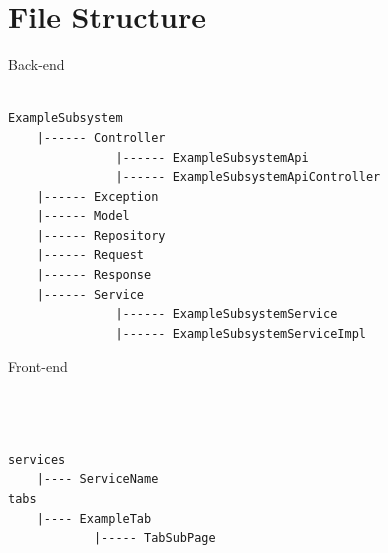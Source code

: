 \documentclass[hidelinks, 12pt, a4paper]{article}
\begin{document}
\section{File Structure}
Back-end
    \begin{code}
    
        \begin{lstlisting}

ExampleSubsystem
    |------ Controller
               |------ ExampleSubsystemApi
               |------ ExampleSubsystemApiController
    |------ Exception
    |------ Model
    |------ Repository
    |------ Request
    |------ Response
    |------ Service
               |------ ExampleSubsystemService
               |------ ExampleSubsystemServiceImpl
        \end{lstlisting}
            
    \end{code}
        Front-end
    \begin{code}
    
        \begin{lstlisting}
        


services
    |---- ServiceName
tabs
    |---- ExampleTab
            |----- TabSubPage
        \end{lstlisting}
            
    \end{code}
\end{document}
